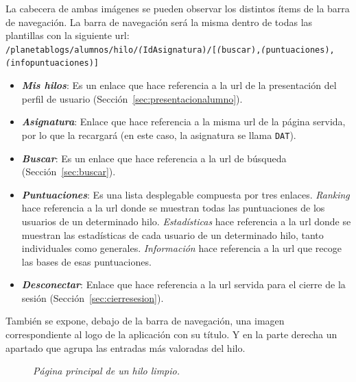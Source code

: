 \documentclass[a4paper, 12pt]{book}
\begin{document}
La cabecera de ambas im\'agenes se pueden observar los distintos \'items de la barra de navegaci\'on. La barra de navegaci\'on ser\'a la misma dentro de
todas las plantillas con la siguiente url: {\scriptsize \texttt{/planetablogs/alumnos/hilo/\textit(IdAsignatura)/[\textit(buscar),\textit(puntuaciones),
\textit(infopuntuaciones)]}}
\begin{itemize}
  \item {\bfseries \textit{Mis hilos}}: Es un enlace que hace referencia a la url de la presentaci\'on del perfil de usuario 
  (Secci\'on~\ref{sec:presentacionalumno}).
  \item {\bfseries \textit{Asignatura}}: Enlace que hace referencia a la misma url de la p\'agina servida, por lo que la recargar\'a (en este caso, 
  la asignatura se llama \texttt{DAT}).
  \item {\bfseries \textit{Buscar}}: Es un enlace que hace referencia a la url de b\'usqueda (Secci\'on~\ref{sec:buscar}).
  \item {\bfseries \textit{Puntuaciones}}: Es una lista desplegable compuesta por tres enlaces. \textit{Ranking} hace referencia a la url donde se muestran 
  todas las puntuaciones de los usuarios de un determinado hilo. \textit{Estad\'isticas} hace referencia a la url donde se muestran las estad\'isticas de 
  cada usuario de un determinado hilo, tanto individuales como generales. \textit{Informaci\'on} hace referencia a la url que recoge las bases de esas 
  puntuaciones.
  \item {\bfseries \textit{Desconectar}}: Enlace que hace referencia a la url servida para el cierre de la sesi\'on (Secci\'on~\ref{sec:cierresesion}).
\end{itemize}
Tambi\'en se expone, debajo de la barra de navegaci\'on, una imagen correspondiente al logo de la aplicaci\'on con su t\'itulo. Y en la parte derecha un 
apartado que agrupa las entradas m\'as valoradas del hilo.

\begin{figure}
  \centering
  \caption{\textit{P\'agina principal de un hilo limpio.}}
  \label{fig:hilos}
\end{figure}
\end{document}
